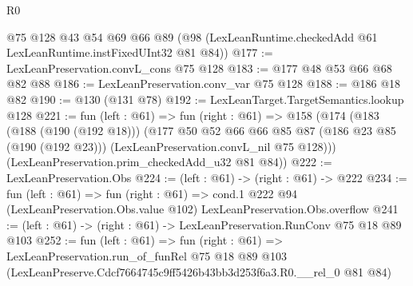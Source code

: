 \begin{lexlean}{R0}
\begin{coremodule}
    @75
    @128
    @43
    @54
    @69
    @66
    @89
    (@98 (LexLeanRuntime.checkedAdd @61 LexLeanRuntime.instFixedUInt32 @81 @84))
@177 := LexLeanPreservation.convL_cons @75 @128
@183 := @177 @48 @53 @66 @68 @82 @88
@186 := LexLeanPreservation.conv_var @75 @128
@188 := @186 @18 @82
@190 := @130 (@131 @78)
@192 := LexLeanTarget.TargetSemantics.lookup @128
@221 := fun (left : @61) =>
  fun (right : @61) =>
  @158
    (@174
      (@183
        (@188 (@190 (@192 @18)))
        (@177
          @50
          @52
          @66
          @66
          @85
          @87
          (@186 @23 @85 (@190 (@192 @23)))
          (LexLeanPreservation.convL_nil @75 @128)))
      (LexLeanPreservation.prim_checkedAdd_u32 @81 @84))
@222 := LexLeanPreservation.Obs
@224 := (left : @61) -> (right : @61) -> @222
@234 := fun (left : @61) =>
  fun (right : @61) =>
  cond.{1} @222 @94 (LexLeanPreservation.Obs.value @102) LexLeanPreservation.Obs.overflow
@241 := (left : @61) -> (right : @61) -> LexLeanPreservation.RunConv @75 @18 @89 @103
@252 := fun (left : @61) =>
  fun (right : @61) =>
  LexLeanPreservation.run_of_funRel
    @75
    @18
    @89
    @103
    (LexLeanPreserve.Cdcf7664745c9ff5426b43bb3d253f6a3.R0.__rel_0 @81 @84)
\end{coremodule}
\end{lexlean}
